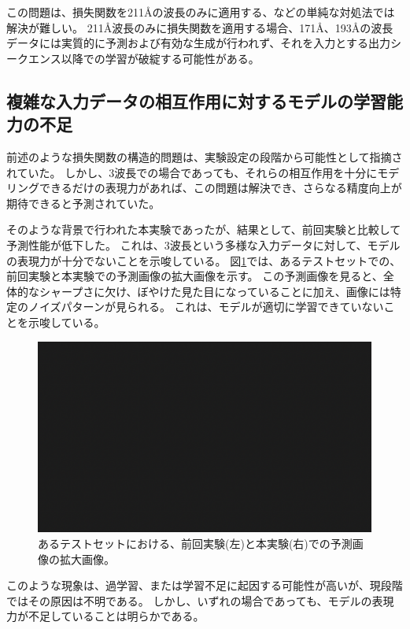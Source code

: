     この問題は、損失関数を211Åの波長のみに適用する、などの単純な対処法では解決が難しい。
    211Å波長のみに損失関数を適用する場合、171Å、193Åの波長データには実質的に予測および有効な生成が行われず、それを入力とする出力シークエンス以降での学習が破綻する可能性がある。
    
    \subsection{複雑な入力データの相互作用に対するモデルの学習能力の不足}
    前述のような損失関数の構造的問題は、実験設定の段階から可能性として指摘されていた。
    しかし、3波長での場合であっても、それらの相互作用を十分にモデリングできるだけの表現力があれば、この問題は解決でき、さらなる精度向上が期待できると予測されていた。

    そのような背景で行われた本実験であったが、結果として、前回実験と比較して予測性能が低下した。
    これは、3波長という多様な入力データに対して、モデルの表現力が十分でないことを示唆している。
    図\ref{fig:exp2_pd_discuss_1}では、あるテストセットでの、前回実験と本実験での予測画像の拡大画像を示す。
    この予測画像を見ると、全体的なシャープさに欠け、ぼやけた見た目になっていることに加え、画像には特定のノイズパターンが見られる。
    これは、モデルが適切に学習できていないことを示唆している。
    \begin{figure}[htbp]
      \centering
      \includegraphics[width=\textwidth]{figures/sample.png}
      \caption{あるテストセットにおける、前回実験(左)と本実験(右)での予測画像の拡大画像。}
      \label{fig:exp2_pd_discuss_1}
    \end{figure}
    このような現象は、過学習、または学習不足に起因する可能性が高いが、現段階ではその原因は不明である。
    しかし、いずれの場合であっても、モデルの表現力が不足していることは明らかである。
    
